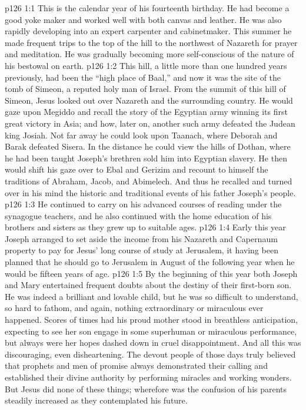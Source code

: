 \vs p126 1:1 This is the calendar year of his fourteenth birthday. He had become a good yoke maker and worked well with both canvas and leather. He was also rapidly developing into an expert carpenter and cabinetmaker. This summer he made frequent trips to the top of the hill to the northwest of Nazareth for prayer and meditation. He was gradually becoming more self\hyp{}conscious of the nature of his bestowal on earth.
\vs p126 1:2 This hill, a little more than one hundred years previously, had been the “high place of Baal,” and now it was the site of the tomb of Simeon, a reputed holy man of Israel. From the summit of this hill of Simeon, Jesus looked out over Nazareth and the surrounding country. He would gaze upon Megiddo and recall the story of the Egyptian army winning its first great victory in Asia; and how, later on, another such army defeated the Judean king Josiah. Not far away he could look upon Taanach, where Deborah and Barak defeated Sisera. In the distance he could view the hills of Dothan, where he had been taught Joseph’s brethren sold him into Egyptian slavery. He then would shift his gaze over to Ebal and Gerizim and recount to himself the traditions of Abraham, Jacob, and Abimelech. And thus he recalled and turned over in his mind the historic and traditional events of his father Joseph’s people.
\vs p126 1:3 He continued to carry on his advanced courses of reading under the synagogue teachers, and he also continued with the home education of his brothers and sisters as they grew up to suitable ages.
\vs p126 1:4 Early this year Joseph arranged to set aside the income from his Nazareth and Capernaum property to pay for Jesus’ long course of study at Jerusalem, it having been planned that he should go to Jerusalem in August of the following year when he would be fifteen years of age.
\vs p126 1:5 By the beginning of this year both Joseph and Mary entertained frequent doubts about the destiny of their first\hyp{}born son. He was indeed a brilliant and lovable child, but he was so difficult to understand, so hard to fathom, and again, nothing extraordinary or miraculous ever happened. Scores of times had his proud mother stood in breathless anticipation, expecting to see her son engage in some superhuman or miraculous performance, but always were her hopes dashed down in cruel disappointment. And all this was discouraging, even disheartening. The devout people of those days truly believed that prophets and men of promise always demonstrated their calling and established their divine authority by performing miracles and working wonders. But Jesus did none of these things; wherefore was the confusion of his parents steadily increased as they contemplated his future.
